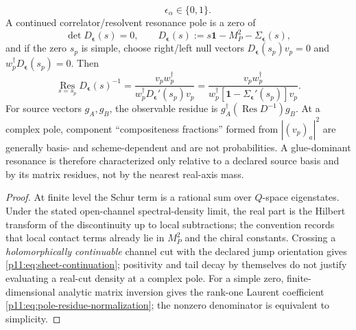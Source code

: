 \documentclass[12pt,a4paper]{article}
\begin{document}
\begin{theorem}
\begin{equation}
\qquad
\epsilon_\alpha\in\{0,1\}.
\end{equation}
A continued correlator/resolvent resonance pole is a zero of
\begin{equation}
\label{p11:eq:physical-pole-determinant-completed}
\det D_{\boldsymbol\epsilon}(s)=0,
\qquad
D_{\boldsymbol\epsilon}(s)
:=s\mathbf 1-M_P^2-\Sigma_{\boldsymbol\epsilon}(s),
\end{equation}
and if the zero \(s_p\) is simple, choose right/left null vectors
\(D_{\boldsymbol\epsilon}(s_p)v_p=0\) and
\(w_p^\dagger D_{\boldsymbol\epsilon}(s_p)=0\).  Then
\begin{equation}
\label{p11:eq:pole-residue-normalization}
\operatorname*{Res}_{s=s_p}D_{\boldsymbol\epsilon}(s)^{-1}
=\frac{v_pw_p^\dagger}
{w_p^\dagger D_{\boldsymbol\epsilon}'(s_p)v_p}
=\frac{v_pw_p^\dagger}
{w_p^\dagger[\mathbf 1-\Sigma_{\boldsymbol\epsilon}'(s_p)]v_p}.
\end{equation}
For source vectors \(g_A,g_B\), the observable residue is
\(g_A^\dagger(\operatorname*{Res}D^{-1})g_B\).  At a complex pole, component
``compositeness fractions'' formed from \(|(v_p)_a|^2\) are generally
basis- and scheme-dependent and are not probabilities.  A glue-dominant
resonance is therefore characterized only relative to a declared source basis
and by its matrix residues, not by the nearest real-axis mass.
\end{theorem}
\begin{proof}
At finite level the Schur term is a rational sum over \(Q\)-space eigenstates.
Under the stated open-channel spectral-density limit, the real part is the
Hilbert transform of the discontinuity up to local subtractions; the convention
records that local contact terms already lie in \(M_P^2\) and the chiral
constants.  Crossing a \emph{holomorphically continuable} channel cut with the declared jump orientation gives
\eqref{p11:eq:sheet-continuation}; positivity and tail decay by themselves do not justify evaluating a real-cut density at a complex pole.  For a simple zero, finite-dimensional
analytic matrix inversion gives the rank-one Laurent coefficient
\eqref{p11:eq:pole-residue-normalization}; the nonzero denominator is
equivalent to simplicity.
\end{proof}
\end{document}
